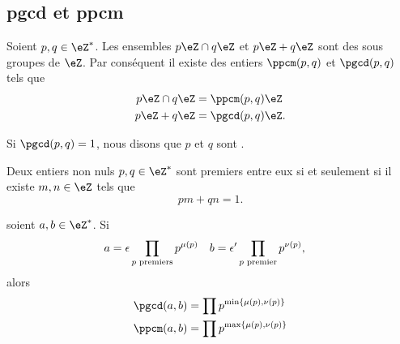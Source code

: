 \subsection{pgcd et ppcm}

Soient \( p,q\in\eZ^*\). Les ensembles \( p\eZ\cap q\eZ\) et \( p\eZ+q\eZ\) sont des sous groupes de \( \eZ\). Par conséquent il existe des entiers \( \ppcm(p,q)\) et \( \pgcd(p,q)\) tels que
\begin{subequations}
    \begin{align}
        p\eZ\cap q\eZ&=\ppcm(p,q)\eZ\\
        p\eZ + q\eZ&=\pgcd(p,q)\eZ.
    \end{align}
\end{subequations}

Si \( \pgcd(p,q)=1\), nous disons que \( p\) et \( q\) sont .

\begin{theorem}
    Deux entiers non nuls \( p,q\in\eZ^*\) sont premiers entre eux si et seulement si il existe \( m,n\in\eZ\) tels que 
    \begin{equation}
        pm+qn=1.
    \end{equation}
\end{theorem}

\begin{proposition}
    soient \( a,b\in\eZ^*\). Si
    \begin{equation}
        \begin{aligned}[]
            a&=\epsilon\prod_{\text{\( p\) premiers}}p^{\mu(p)}&b&=\epsilon'\prod_{\text{\( p\) premier}}p^{\nu(p)},
        \end{aligned}
    \end{equation}
    alors
    \begin{subequations}
        \begin{align}
            \pgcd(a,b)&=\prod p^{\min\{ \mu(p),\nu(p) \}}\\
            \ppcm(a,b)&=\prod p^{\max\{ \mu(p),\nu(p) \}}
        \end{align}
    \end{subequations}    
\end{proposition}

